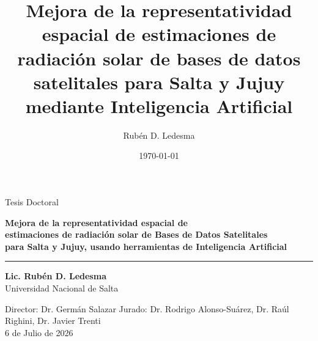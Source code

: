 \documentclass[aspectratio=169,11pt]{beamer}
\title{Mejora de la representatividad espacial de estimaciones de radiación solar de bases de datos satelitales para Salta y Jujuy mediante Inteligencia Artificial}
\author{Rubén D. Ledesma}
\date{\today}
\begin{document}
\begin{frame}[plain]
  \vspace{1.1cm}
  {\color{white}\hfill\footnotesize Tesis Doctoral\hspace{0.6cm}}

  \vspace{1.6cm}
  {\color{primary}\bfseries\large Mejora de la representatividad espacial de\\[2pt] estimaciones de radiación solar de 
  Bases de Datos Satelitales\\[2pt]
   para Salta y Jujuy, usando herramientas de Inteligencia Artificial}


  \vspace{0.5em}
  {\color{accent}\rule{0.55\linewidth}{1.4pt}}

  \vspace{0.8em}
  {\bfseries Lic. Rubén D. Ledesma}\\[0.3em]
  {\footnotesize\color{midgray} Universidad Nacional de Salta}

  \vfill
  {\scriptsize\color{midgray}
   Director: Dr. Germán Salazar \quad\textbar\quad %
   Jurado: Dr. Rodrigo Alonso-Suárez, Dr. Raúl Righini, Dr. Javier Trenti\\[2pt] \hfill 6 de Julio de 2026}
  \vspace{0.4cm}
\end{frame}
\end{document}
